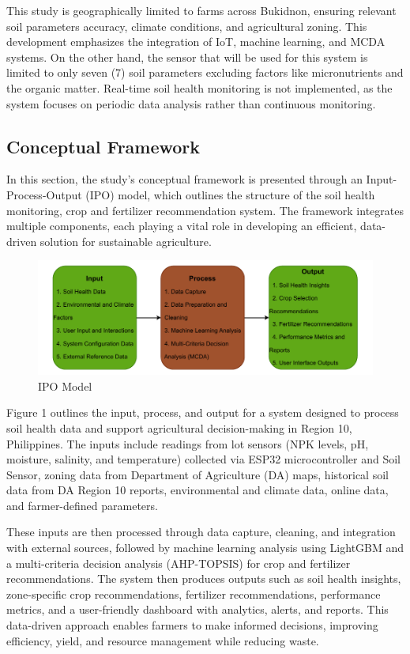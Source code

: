 {This study is geographically limited to farms across Bukidnon, ensuring relevant soil parameters accuracy, climate conditions, and agricultural zoning. This development emphasizes the integration of IoT, machine learning, and MCDA systems. On the other hand, the sensor that will be used for this system is limited to only seven (7) soil parameters excluding factors like micronutrients and the organic matter. Real-time soil health monitoring is not implemented, as the system focuses on periodic data analysis rather than continuous monitoring.

\subsection{Conceptual Framework}

In this section, the study’s conceptual framework is presented through an Input-Process-Output (IPO) model, which outlines the structure of the soil health monitoring, crop and fertilizer recommendation system. The framework integrates multiple components, each playing a vital role in developing an efficient, data-driven solution for sustainable agriculture.

\begin{figure}[H]
	\centering
	\caption{IPO Model}
	\label{fig:ipo}
	\includegraphics[width=1\textwidth]{figures/IPO.pdf}
\end{figure}

Figure 1 outlines the input, process, and output for a system designed to process soil health data and support agricultural decision-making in Region 10, Philippines. The inputs include  readings from lot sensors (NPK levels, pH, moisture, salinity, and temperature) collected via ESP32 microcontroller and Soil Sensor, zoning data from Department of Agriculture (DA) maps, historical soil data from DA Region 10 reports, environmental and climate data, online data, and farmer-defined parameters.

These inputs are then processed through data capture, cleaning, and integration with external sources, followed by machine learning analysis using LightGBM and a multi-criteria decision analysis (AHP-TOPSIS) for crop and fertilizer recommendations. The system then produces outputs such as soil health insights, zone-specific crop recommendations, fertilizer recommendations, performance metrics, and a user-friendly dashboard with  analytics, alerts, and reports. This data-driven approach enables farmers to make informed decisions, improving efficiency, yield, and resource management while reducing waste.

}
